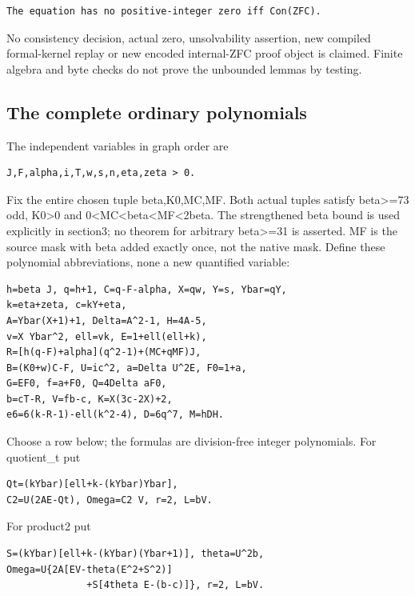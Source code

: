 \begin{verbatim}
The equation has no positive-integer zero iff Con(ZFC).
\end{verbatim}

No consistency decision, actual zero, unsolvability assertion, new
compiled formal-kernel replay or new encoded internal-ZFC proof object
is claimed. Finite algebra and byte checks do not prove the unbounded
lemmas by testing.

\subsection{The complete ordinary
polynomials}\label{the-complete-ordinary-polynomials}

The independent variables in graph order are

\begin{verbatim}
J,F,alpha,i,T,w,s,n,eta,zeta > 0.
\end{verbatim}

Fix the entire chosen tuple beta,K0,MC,MF. Both actual tuples satisfy
beta\textgreater=73 odd, K0\textgreater0 and
0\textless MC\textless beta\textless MF\textless2beta. The strengthened
beta bound is used explicitly in section3; no theorem for arbitrary
beta\textgreater=31 is asserted. MF is the source mask with beta added
exactly once, not the native mask. Define these polynomial
abbreviations, none a new quantified variable:

\begin{verbatim}
h=beta J, q=h+1, C=q-F-alpha, X=qw, Y=s, Ybar=qY,
k=eta+zeta, c=kY+eta,
A=Ybar(X+1)+1, Delta=A^2-1, H=4A-5,
v=X Ybar^2, ell=vk, E=1+ell(ell+k),
R=[h(q-F)+alpha](q^2-1)+(MC+qMF)J,
B=(K0+w)C-F, U=ic^2, a=Delta U^2E, F0=1+a,
G=EF0, f=a+F0, Q=4Delta aF0,
b=cT-R, V=fb-c, K=X(3c-2X)+2,
e6=6(k-R-1)-ell(k^2-4), D=6q^7, M=hDH.
\end{verbatim}

Choose a row below; the formulas are division-free integer polynomials.
For quotient\_t put

\begin{verbatim}
Qt=(kYbar)[ell+k-(kYbar)Ybar],
C2=U(2AE-Qt), Omega=C2 V, r=2, L=bV.
\end{verbatim}

For product2 put

\begin{verbatim}
S=(kYbar)[ell+k-(kYbar)(Ybar+1)], theta=U^2b,
Omega=U{2A[EV-theta(E^2+S^2)]
              +S[4theta E-(b-c)]}, r=2, L=bV.
\end{verbatim}


